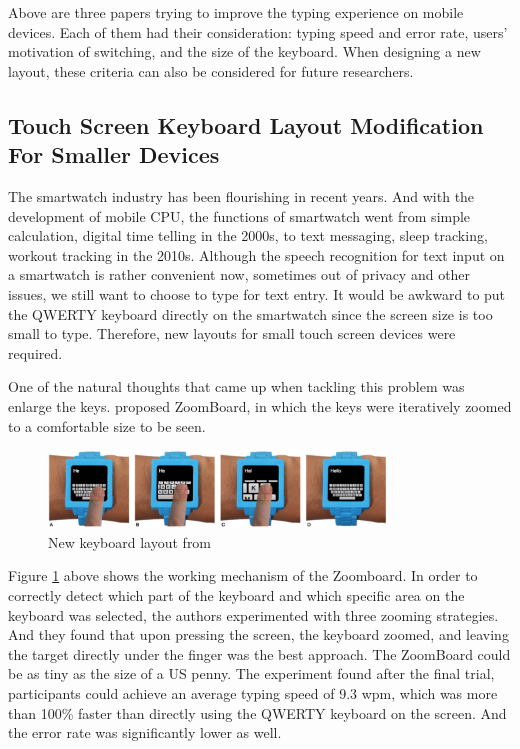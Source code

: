 \documentclass[11pt]{article}
\begin{document}
Above are three papers trying to improve the typing experience on mobile devices. Each of them had their  consideration: typing speed and error rate, users' motivation of switching, and the size of the keyboard. When designing a new layout, these criteria can also be considered for future researchers.

\subsection{Touch Screen Keyboard Layout Modification For Smaller Devices}

The smartwatch industry has been flourishing in recent years. And with the development of mobile CPU, the functions of smartwatch went from simple calculation, digital time telling in the 2000s, to text messaging, sleep tracking, workout tracking in the 2010s. Although the speech recognition for text input on a smartwatch is rather convenient now, sometimes out of privacy and other issues, we still want to choose to type for text entry. It would be awkward to put the QWERTY keyboard directly on the smartwatch since the screen size is too small to type. Therefore, new layouts for small touch screen devices were required.

One of the natural thoughts that came up when tackling this problem was enlarge the keys. \citet{10.1145/2470654.2481387} proposed ZoomBoard, in which the keys were iteratively zoomed to a comfortable size to be seen.

\begin{figure}[H]
  \centering
  \includegraphics[width=0.8\textwidth]{ZoomBoard.png}
  \caption{New keyboard layout from \citep{10.1145/2470654.2481387}}
  \label{fig:zoomboard}
\end{figure}

Figure \ref{fig:zoomboard} above shows the working mechanism of the Zoomboard. In order to correctly detect which part of the keyboard and which specific area on the keyboard was selected, the authors experimented with three zooming strategies. And they found that upon pressing the screen, the keyboard zoomed, and leaving the target directly under the finger was the best approach. The ZoomBoard could be as tiny as the size of a US penny. The experiment found after the final trial, participants could achieve an average typing speed of 9.3 wpm, which was more than 100\% faster than directly using the QWERTY keyboard on the screen. And the error rate was significantly lower as well.
\end{document}
